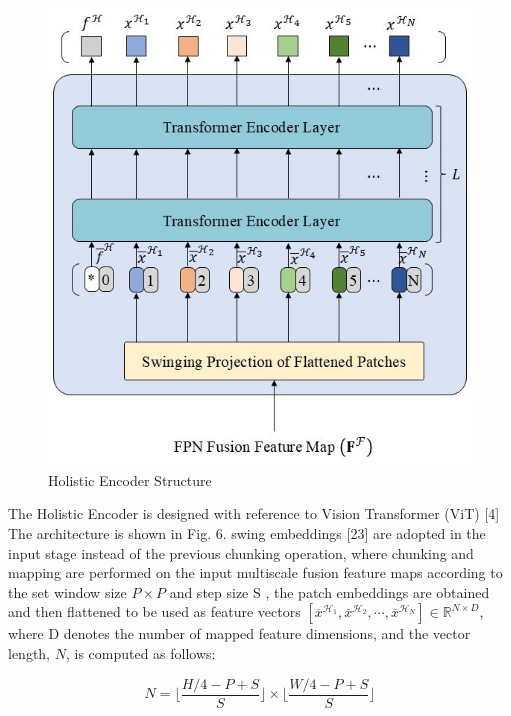 \begin{figure}[H]
  \begin{center}
      \includegraphics[scale=0.6]{figure/encoder.jpg}
  \end{center}
  \caption{Holistic Encoder Structure}
  \label{fig:encoder}
\end{figure}

The Holistic Encoder is designed with reference to Vision Transformer (ViT) [4] The architecture is shown in Fig. 6. swing embeddings [23] are adopted in the input stage instead of the previous chunking operation, where chunking and mapping are performed on the input multiscale fusion feature maps according to the set window size $P\times P$ and step size S , the patch embeddings are obtained and then flattened to be used as feature vectors $[\overline{x}^{\mathcal{H}_1},\overline{x}^{\mathcal{H}_2},\cdots ,\overline{x}^{\mathcal{H}_N}] \in \mathbb{R}^{N\times D}$, where D denotes the number of mapped feature dimensions, and the vector length, $N$, is computed as follows:


\begin{equation}
\label{eq5}
  N=\lfloor \frac{H/4-P+S}{S}\rfloor \times \lfloor \frac{W/4-P+S}{S}\rfloor
\end{equation}

